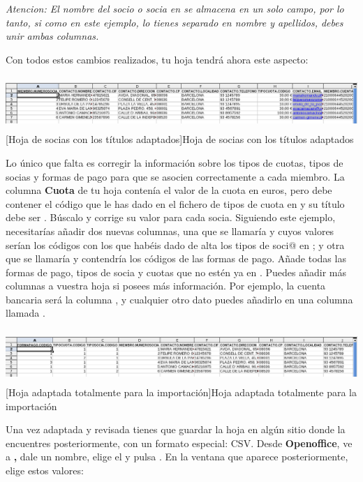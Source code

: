 {\itshape
Atencion: El nombre del socio o socia en \appname se almacena en un solo
campo, por lo tanto, si como en este ejemplo, lo tienes separado en
nombre y apellidos, debes unir ambas columnas.}

Con todos estos cambios realizados, tu hoja tendrá ahora este aspecto:


\bigskip



\begin{center}
\includegraphics[width=16.999cm,height=2.021cm]{manual-img17.png}
[Hoja de socias con los títulos adaptados]{Hoja de
socias con los títulos adaptados}

\end{center}
Lo único que falta es corregir la información sobre los tipos de
cuotas, tipos de socias y formas de pago para que se asocien
correctamente a cada miembro. La columna \textbf{Cuota} de tu hoja
contenía el valor de la cuota en euros, pero debe contener el
código que le has dado en el fichero de tipos de cuota en \appname y
su título debe ser . Búscalo y
corrige su valor para cada socia. Siguiendo este ejemplo,
necesitarías añadir dos nuevas columnas, una que se llamaría
 y cuyos valores serían los
códigos con los que habéis dado de alta los tipos de soci@ en
\appname; y otra que se llamaría
 y contendría los códigos de
las formas de pago. Añade todas las formas de pago, tipos de socia y
cuotas que no estén ya en \appname. Puedes añadir más columnas a
vuestra hoja si posees más información. Por ejemplo, la cuenta
bancaria será la columna ,
y cualquier otro dato puedes añadirlo en una columna llamada
.



\begin{center}
\includegraphics[width=16.999cm,height=1.995cm]{manual-img18.png}
[Hoja adaptada totalmente para la importación]{Hoja
adaptada totalmente para la importación}

\end{center}
Una vez adaptada y revisada tienes que guardar la hoja en algún sitio
donde la encuentres posteriormente, con un formato especial: CSV. Desde
\textbf{Openoffice}, ve a \textbf{, }dale un nombre,\textbf{ }elige el
 y pulsa
. En la ventana que aparece
posteriormente, elige estos valores:



